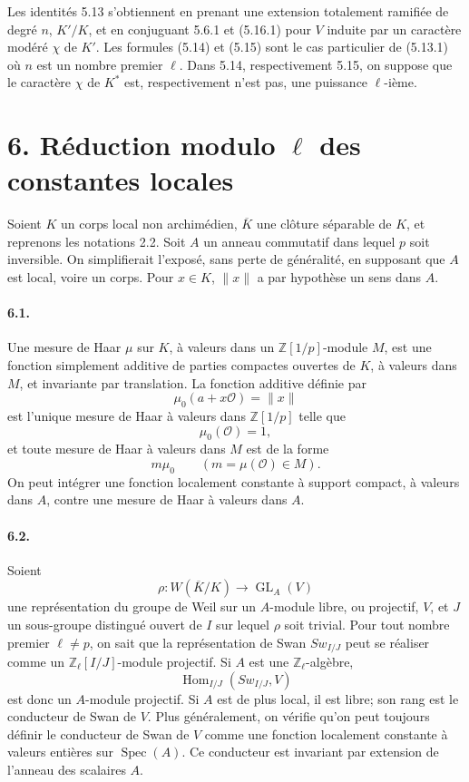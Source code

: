 \documentclass[10pt,letterpaper]{article}
\newcommand{\GL}{\operatorname{GL}}
\newcommand{\Hom}{\operatorname{Hom}}
\newcommand{\Spec}{\operatorname{Spec}}
\providecommand{\Spec}{\operatorname{Spec}}
\providecommand{\Hom}{\operatorname{Hom}}
\providecommand{\GL}{\operatorname{GL}}
\providecommand{\GL}{\operatorname{GL}}
\providecommand{\Hom}{\operatorname{Hom}}
\providecommand{\Spec}{\operatorname{Spec}}
\providecommand{\Spec}{\operatorname{Spec}}
\providecommand{\Hom}{\operatorname{Hom}}
\begin{document}
Les identités 5.13 s'obtiennent en prenant une extension totalement ramifiée de degré \(n\), \(K'/K\), et en conjuguant 5.6.1 et (5.16.1) pour \(V\) induite par un caractère modéré \(\chi\) de \(K'\). Les formules (5.14) et (5.15) sont le cas particulier de (5.13.1) où \(n\) est un nombre premier \(\ell\). Dans 5.14, respectivement 5.15, on suppose que le caractère \(\chi\) de \(K^*\) est, respectivement n'est pas, une puissance \(\ell\)-ième.

\section*{6. Réduction modulo \(\ell\) des constantes locales}

Soient \(K\) un corps local non archimédien, \(\overline K\) une clôture séparable de \(K\), et reprenons les notations 2.2. Soit \(A\) un anneau commutatif dans lequel \(p\) soit inversible. On simplifierait l'exposé, sans perte de généralité, en supposant que \(A\) est local, voire un corps. Pour \(x\in K\), \(\|x\|\) a par hypothèse un sens dans \(A\).

\paragraph{6.1.} Une mesure de Haar \(\mu\) sur \(K\), à valeurs dans un \(\mathbb Z[1/p]\)-module \(M\), est une fonction simplement additive de parties compactes ouvertes de \(K\), à valeurs dans \(M\), et invariante par translation. La fonction additive définie par
\[
\mu_0(a+x\mathcal O)=\|x\|
\]
est l'unique mesure de Haar à valeurs dans \(\mathbb Z[1/p]\) telle que
\[
\mu_0(\mathcal O)=1,
\]
et toute mesure de Haar à valeurs dans \(M\) est de la forme
\[
m\mu_0\qquad(m=\mu(\mathcal O)\in M).
\]
On peut intégrer une fonction localement constante à support compact, à valeurs dans \(A\), contre une mesure de Haar à valeurs dans \(A\).

\paragraph{6.2.} Soient
\[
\rho:W(\overline K/K)\longrightarrow\GL_A(V)
\]
une représentation du groupe de Weil sur un \(A\)-module libre, ou projectif, \(V\), et \(J\) un sous-groupe distingué ouvert de \(I\) sur lequel \(\rho\) soit trivial. Pour tout nombre premier \(\ell\ne p\), on sait que la représentation de Swan \(Sw_{I/J}\) peut se réaliser comme un \(\mathbb Z_\ell[I/J]\)-module projectif. Si \(A\) est une \(\mathbb Z_\ell\)-algèbre,
\[
\Hom_{I/J}(Sw_{I/J},V)
\]
est donc un \(A\)-module projectif. Si \(A\) est de plus local, il est libre; son rang est le conducteur de Swan de \(V\). Plus généralement, on vérifie qu'on peut toujours définir le conducteur de Swan de \(V\) comme une fonction localement constante à valeurs entières sur \(\Spec(A)\). Ce conducteur est invariant par extension de l'anneau des scalaires \(A\).
\end{document}
